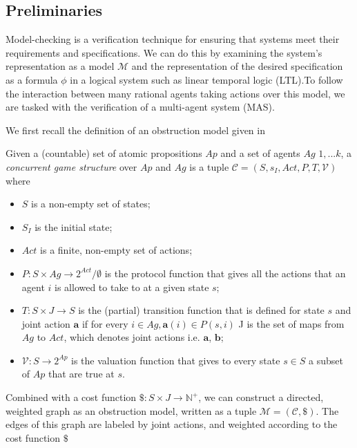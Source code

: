 
\subsection{Preliminaries}
Model-checking is a verification technique for ensuring that systems meet their requirements and specifications. We can do this by examining the system's representation as a model $\mathcal{M}$ and the representation of the desired specification as a formula $\phi$ in a logical system such as linear temporal logic (LTL).To follow the interaction between many rational agents taking actions over this model, we are tasked with the verification of a multi-agent system (MAS).

We first recall the definition of an obstruction model given in \cite{catta2024obstruction}


\begin{definition}
Given a (countable) set of atomic propositions $Ap$ and a set of agents $Ag$ ${1, ... k}$, a \textit{concurrent game structure} over $Ap$ and $Ag$ is a tuple
$\mathcal{C} = (S, s_{I}, Act, P, T, \mathcal{V})$ where
\begin{itemize}
    \item $S$ is a non-empty set of states;
    \item $S_{I}$ is the initial state;
    \item $Act$ is a finite, non-empty set of actions;
    \item $P: S \times Ag \rightarrow 2^{Act}/ \emptyset$ is the protocol function that gives all the actions that an agent $i$ is allowed to take to at a given state $s$;
    \item $T: S \times J \rightarrow S$ is the (partial) transition function that is defined for state $s$ and joint action $\mathbf{a}$ if for every $i \in Ag, \mathbf{a}(i)\in P(s,i)$ J is the set of maps from $Ag$ to $Act$, which denotes joint actions i.e. $\mathbf{a}$, $\mathbf{b}$;
    \item $\mathcal{V}: S \rightarrow 2^{Ap}$ is the valuation function that gives to every state $s \in S$ a subset of $Ap$ that are true at $s$.
\end{itemize}
Combined with a cost function $\$: S \times J \rightarrow \mathbb{N}^{+}$, we can construct a directed, weighted graph as an obstruction model, written as a tuple $\mathcal{M} = (\mathcal{C}, \$ )$. The edges of this graph are labeled by joint actions, and weighted according to the cost function $ \$ $
\end{definition}

